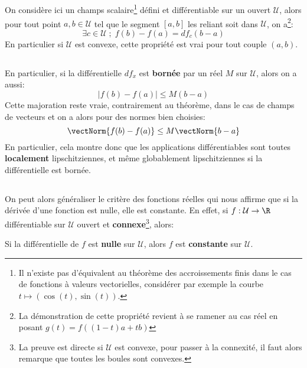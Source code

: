 \subsection*{}
On considère ici un champs scalaire\footnote[2]{Il n'existe pas d'équivalent au théorème des accroissements finis dans le cas de fonctions à valeurs vectorielles, considérer par exemple la courbe \(t \mapsto (\cos(t), \sin(t))\).} défini et différentiable sur un ouvert \(\mathcal{U}\), alors pour tout point \(a, b \in \mathcal{U}\) tel que le segment \([a, b]\) les reliant soit dans \(\mathcal{U}\), on a\footnote[3]{La démonstration de cette propriété revient à se ramener au cas réel en posant \(g(t) = f((1 - t)a + tb)\)}:
\[
   \exists c \in \mathcal{U} \; ; \; f(b) - f(a) = df_c(b - a)   
\]
En particulier si \(\mathcal{U}\) est convexe, cette propriété est vrai pour tout couple \((a, b)\).

\subsection*{}
En particulier, si la différentielle \(df_x\) est \textbf{bornée} par un réel \(M\) sur \(\mathcal{U}\), alors on a aussi:
\[
   |f(b) - f(a)| \leq M(b - a)
\]
Cette majoration reste vraie, contrairement au théorème, dans le cas de champs de vecteurs et on a alors pour des normes bien choisies:
\[
   \vectNorm{f(b) - f(a)} \leq M\vectNorm{b - a}
\]
En particulier, cela montre donc que les applications différentiables sont toutes \textbf{localement} lipschitziennes, et même globablement lipschitziennes si la différentielle est bornée.

\subsection*{}
On peut alors généraliser le critère des fonctions réelles qui nous affirme que si la dérivée d'une fonction est nulle, elle est constante. En effet, si \(f : \mathcal{U} \rightarrow \R\) différentiable sur \(\mathcal{U}\) ouvert et \textbf{connexe}\footnote[4]{La preuve est directe si \(\mathcal{U}\) est convexe, pour passer à la connexité, il faut alors remarque que toutes les boules sont convexes.}, alors:
\begin{center}
   Si la différentielle de \(f\) est \textbf{nulle} sur \(\mathcal{U}\), alors \(f\) est \textbf{constante} sur \(\mathcal{U}\).
\end{center}

